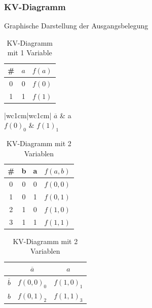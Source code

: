 \documentclass[10pt,a4paper]{scrartcl}
\begin{document}
\subsubsection{KV-Diagramm}
Graphische Darstellung der Ausgangsbelegung
\begin{table}[h!]
\centering
	\begin{tabular}{ccc}
		\# & $ a $ & $ f(a) $\\
		\hline
		0 & 0 & $ f(0) $\\
		1 & 1 & $ f(1) $\\
	\end{tabular}
\quad
	\begin{tabular}{|wc{1cm}|wc{1cm}|}
		$ \overline{a} $ & a \\ \hline
		$ f(0)_{0} $ & $ f(1)_1 $ \\ \hline
	\end{tabular}
\caption{KV-Diagramm mit 1 Variable}
\end{table}
\begin{table}[h!]
	\centering
	\begin{tabular}{c|cc|c}
		\# & b & a & $ f(a,b) $\\ \hline
		0 & 0 & 0 & $ f(0,0) $\\
		1 & 0 & 1 & $ f(0,1) $\\
		2 & 1 & 0 & $ f(1,0) $\\
		3 & 1 & 1 & $ f(1,1) $\\
	\end{tabular}
\quad
	\begin{tabular}{c|c|c|}
		 & $ \overline{a} $  &  $ a $\\ \hline
		 $ \overline{b} $  &  $ f(0,0)_{0} $  &  $ f(1,0)_{1} $ \\ \hline
		 $ b $ & $ f(0,1)_2 $  &  $ f(1,1) _3$ \\ \hline
	\end{tabular}	
\caption{KV-Diagramm mit 2 Variablen}
\end{table}
\end{document}
